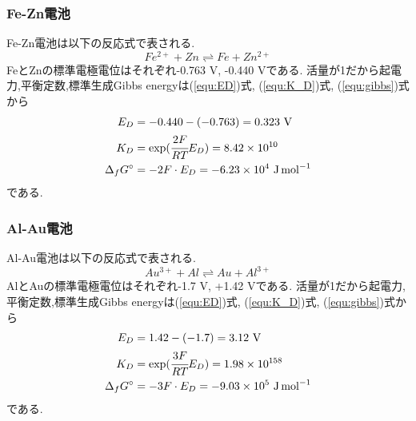 \subsubsection{Fe-Zn電池}
Fe-Zn電池は以下の反応式で表される.
\begin{equation*}
  Fe^{2+}+Zn\rightleftharpoons Fe+Zn^{2+}
\end{equation*}
FeとZnの標準電極電位はそれぞれ-0.763 \si{\volt}, -0.440 \si{\volt}である.
活量が1だから起電力,平衡定数,標準生成Gibbs energyは(\ref{equ:ED})式, (\ref{equ:K_D})式, (\ref{equ:gibbs})式から
\begin{align*}
  E_D&=-0.440-(-0.763)=0.323\ \si{\volt}\\
  K_D&=\exp(\cfrac{2F}{RT}E_D)=8.42\times10^{10}\\
  \Delta_fG^{\circ}&=-2F\cdot E_D=-6.23\times10^4\ \si{\joule.\mole^{-1}}
\end{align*}
である.
\subsubsection{Al-Au電池}
Al-Au電池は以下の反応式で表される.
\begin{equation*}
  Au^{3+}+Al\rightleftharpoons Au+Al^{3+}
\end{equation*}
AlとAuの標準電極電位はそれぞれ-1.7 \si{\volt}, +1.42 \si{\volt}である.
活量が1だから起電力,平衡定数,標準生成Gibbs energyは(\ref{equ:ED})式, (\ref{equ:K_D})式, (\ref{equ:gibbs})式から
\begin{align*}
  E_D&=1.42-(-1.7)=3.12\ \si{\volt}\\
  K_D&=\exp(\cfrac{3F}{RT}E_D)=1.98\times10^{158}\\
  \Delta_fG^{\circ}&=-3F\cdot E_D=-9.03\times10^5\ \si{\joule.\mole^{-1}}
\end{align*}
である.
